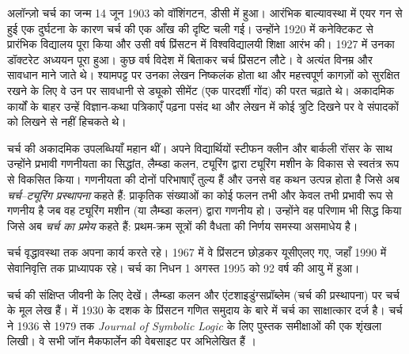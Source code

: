 \documentclass[../../../include/open-logic-section]{subfiles}
\begin{document}



अलॉन्ज़ो चर्च का जन्म 14 जून 1903 को वॉशिंगटन, डीसी में हुआ। आरंभिक
बाल्यावस्था में एयर गन से हुई एक दुर्घटना के कारण चर्च की एक आँख की दृष्टि
चली गई। उन्होंने 1920 में कनेक्टिकट से प्रारंभिक विद्यालय पूरा किया और उसी
वर्ष प्रिंसटन में विश्वविद्यालयी शिक्षा आरंभ की। 1927 में उनका डॉक्टरेट
अध्ययन पूरा हुआ। कुछ वर्ष विदेश में बिताकर चर्च प्रिंसटन लौटे। वे अत्यंत
विनम्र और सावधान माने जाते थे। श्यामपट्ट पर उनका लेखन निष्कलंक होता था और
महत्त्वपूर्ण कागज़ों को सुरक्षित रखने के लिए वे उन पर सावधानी से ड्यूको
सीमेंट (एक पारदर्शी गोंद) की परत चढ़ाते थे। अकादमिक कार्यों के बाहर उन्हें
विज्ञान-कथा पत्रिकाएँ पढ़ना पसंद था और लेखन में कोई त्रुटि दिखने पर वे
संपादकों को लिखने से नहीं हिचकते थे।

चर्च की अकादमिक उपलब्धियाँ महान थीं। अपने विद्यार्थियों स्टीफन क्लीन और
बार्कली रॉसर के साथ उन्होंने प्रभावी गणनीयता का सिद्धांत, लैम्ब्डा कलन,
ट्यूरिंग द्वारा ट्यूरिंग मशीन के विकास से स्वतंत्र रूप से विकसित किया।
गणनीयता की दोनों परिभाषाएँ तुल्य हैं और उनसे वह कथन उत्पन्न होता है जिसे अब
\emph{चर्च--ट्यूरिंग प्रस्थापना} कहते हैं: प्राकृतिक संख्याओं का कोई फलन
तभी और केवल तभी प्रभावी रूप से गणनीय है जब वह ट्यूरिंग मशीन (या लैम्ब्डा
कलन) द्वारा गणनीय हो। उन्होंने वह परिणाम भी सिद्ध किया जिसे अब \emph{चर्च
का प्रमेय} कहते हैं: प्रथम-क्रम सूत्रों की वैधता की निर्णय समस्या असमाधेय
है।

चर्च वृद्धावस्था तक अपना कार्य करते रहे। 1967 में वे प्रिंसटन छोड़कर यूसीएलए
गए, जहाँ 1990 में सेवानिवृत्ति तक प्राध्यापक रहे। चर्च का निधन 1 अगस्त 1995
को 92 वर्ष की आयु में हुआ।

\begin{reading} 
चर्च की संक्षिप्त जीवनी के लिए \citet{EndertonND} देखें। लैम्ब्डा कलन और
एंटशाइडुंग्सप्रॉब्लेम (चर्च की प्रस्थापना) पर चर्च के मूल लेख
\citet{Church1936,Church1936a} हैं। \citet{Aspray1984} में 1930 के दशक के
प्रिंसटन गणित समुदाय के बारे में चर्च का साक्षात्कार दर्ज है। चर्च ने 1936
से 1979 तक \emph{Journal of Symbolic Logic} के लिए पुस्तक समीक्षाओं की एक
शृंखला लिखी। वे सभी जॉन मैकफार्लेन की वेबसाइट पर अभिलेखित हैं
\citep{MacFarlane2015}।
\end{reading} 
\end{document}
